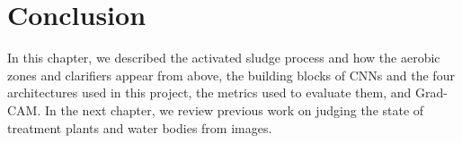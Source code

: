 \section{Conclusion}\label{sec:background_conclusion}

In this chapter, we described the activated sludge process and how the aerobic zones and clarifiers appear from above, the building blocks of CNNs and the four architectures used in this project, the metrics used to evaluate them, and Grad-CAM. In the next chapter, we review previous work on judging the state of treatment plants and water bodies from images.

